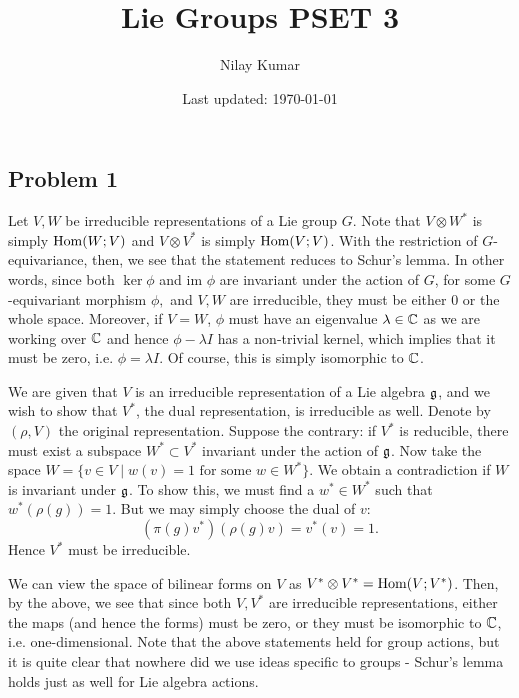 \documentclass{../../mathnotes}
\title{Lie Groups PSET 3}
\author{Nilay Kumar}
\date{Last updated: \today}
\begin{document}
\maketitle

\subsection*{Problem 1}

Let $V,W$ be irreducible representations of a Lie group $G$. Note that $V\otimes W^*$ is simply $\operatorname{Hom}(W;V)$ and $V\otimes V^*$
is simply $\operatorname{Hom}(V;V)$. With the restriction of $G$-equivariance, then, we see that the statement reduces to Schur's lemma. In
other words, since both $\ker\phi$ and $\text{im }\phi$ are invariant under the action of $G$, for some $G$-equivariant morphism $\phi,$
and $V,W$ are irreducible, they must be either 0 or the whole space. Moreover, if $V=W$, $\phi$ must have an eigenvalue $\lambda\in\mathbb{C}$ as
we are working over $\mathbb{C}$ and hence $\phi-\lambda I$ has a non-trivial kernel, which implies that it must be zero, i.e. $\phi=\lambda I$.
Of course, this is simply isomorphic to $\mathbb{C}$.


We are given that $V$ is an irreducible representation of a Lie algebra $\mathfrak g$, and we wish to show that $V^*$, the dual representation, is
irreducible as well. Denote by $(\rho,V)$ the original representation. Suppose the contrary: if $V^*$ is reducible, there must exist a subspace $W^*\subset V^*$ invariant under the action of $\mathfrak g$.
Now take the space $W=\{v\in V \mid w(v)=1\text{ for some } w\in W^*\}$. We obtain a contradiction if $W$ is invariant under $\mathfrak g$. To show this,
we must find a $w^*\in W^*$ such that $w^*(\rho(g))=1$. But we may simply choose the dual of $v$:
\[\left(\pi(g)v^*\right)(\rho(g)v)=v^*(v)=1.\]
Hence $V^*$ must be irreducible.


We can view the space of bilinear forms on $V$ as $V^*\otimes V^*=\operatorname{Hom}(V;V^*)$. Then, by the above, we see that since both $V,V^*$ are
irreducible representations, either the maps (and hence the forms) must be zero, or they must be isomorphic to $\mathbb{C}$, i.e. one-dimensional.
Note that the above statements held for group actions, but it is quite clear that nowhere did we use ideas specific to groups - Schur's lemma
holds just as well for Lie algebra actions.
\end{document}
